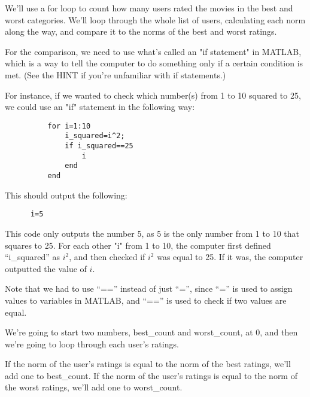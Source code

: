 \documentclass{ximera}
\begin{document}
\begin{exploration}
    We'll use a for loop to count how many users rated the movies in the best and worst categories. We'll loop through the whole list of users, calculating each norm along the way, and compare it to the norms of the best and worst ratings. 
    
    For the comparison, we need to use what's called an "if statement" in MATLAB, which is a way to tell the computer to do something only if a certain condition is met. (See the HINT if you're unfamiliar with if statements.)


      For instance, if we wanted to check which number(s) from 1 to 10 squared to 25, we could use an "if" statement in the following way:
      \begin{verbatim}
          for i=1:10
              i_squared=i^2;
              if i_squared==25
                  i
              end
          end
      \end{verbatim}

   This should output the following:

    \begin{verbatim}
      i=5
    \end{verbatim}

      This code only outputs the number 5, as 5 is the only number from 1 to 10 that squares to 25. For each other "i" from 1 to 10, the computer first defined ``i\_squared'' as $i^2$, and then checked if $i^2$ was equal to 25. If it was, the computer outputted the value of $i$.

      Note that we had to use ``=='' instead of just ``='', since ``='' is used to assign values to variables in MATLAB, and ``=='' is used to check if two values are equal.

    
    We're going to start two numbers, best\_count and worst\_count, at 0, and then we're going to loop through each user's ratings. 
    
    If the norm of the user's ratings is equal to the norm of the best ratings, we'll add one to best\_count. If the norm of the user's ratings is equal to the norm of the worst ratings, we'll add one to worst\_count.


\end{exploration}
\end{document}
